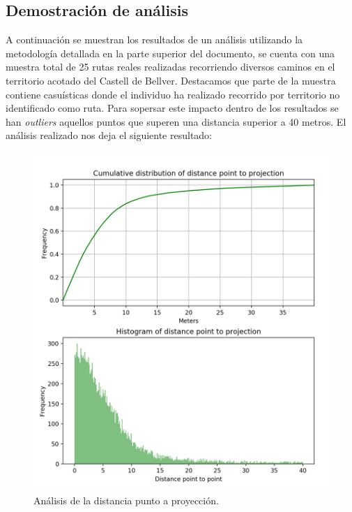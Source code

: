\subsection{Demostración de análisis}
A continuación se muestran los resultados de un análisis utilizando la metodología detallada en 
la parte superior del documento, se cuenta con una muestra total de 25 rutas reales realizadas 
recorriendo diversos caminos en el territorio acotado del Castell de Bellver. Destacamos que parte 
de la muestra contiene casuísticas donde el individuo ha realizado recorrido por territorio no identificado como ruta. Para sopersar este impacto dentro de los resultados se han \textit{outliers} aquellos puntos 
que superen una distancia superior a 40 metros. El análisis realizado nos deja el siguiente resultado:
\begin{figure}[!htb]
\begin{minipage}{0.48\textwidth}
\centering
\includegraphics[width=1.2\textwidth]{./Imagenes/PointToProjection.png}
\caption{Análisis de la distancia punto a proyección.}
\label{figure:PointToProjection}
\end{minipage}\hfill
\begin{minipage}{0.48\textwidth}

\end{minipage}
\end{figure}
